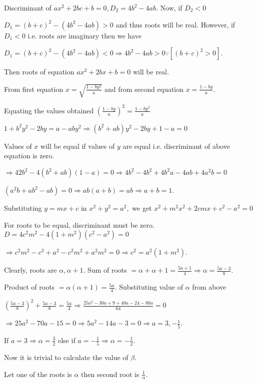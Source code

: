   Discriminant of $ax^2 + 2bc + b = 0, D_2 = 4b^2 - 4ab$. Now, if $D_2 < 0$

  $D_1 = (b + c)^2 - (4b^2 - 4ab) > 0$ and thus roots will be real. However, if $D_1 < 0$ i.e. roots are imaginary then we have

  $D_1 = (b + c)^2 - (4b^2 - 4ab) < 0 \Rightarrow 4b^2 - 4ab > 0 \because [(b + c)^2 > 0]$.

  Then roots of equation $ax^2 + 2bx + b = 0$ will be real.
\item From first equation $x = \sqrt{\frac{1 - by^2}{a}}$ and from second equation $x = \frac{1 - by}{a}$.

  Equating the values obtained $\left(\frac{1 - by}{a}\right)^2 = \frac{1 - by^2}{a}$

  $1 + b^2y^2 - 2by = a - aby^2 \Rightarrow (b^2 + ab)y^2 - 2by + 1 - a = 0$

  Values of $x$ will be equal if values of $y$ are equal i.e. discriminant of above equation is zero.

  $\Rightarrow 42b^2 - 4(b^2 + ab)(1 - a) = 0 \Rightarrow  4b^2 - 4b^2 + 4b^2a - 4ab + 4a^2b = 0$

  $(a^2b + ab^2 - ab) = 0\Rightarrow ab(a + b) = ab\Rightarrow a + b = 1$.
\item Substituting $y = mx + c$ in $x^2 + y^2 = a^2,$ we get $x^2 + m^2x^2 + 2cmx + c^2 - a^2 = 0$

  For roots to be equal, discriminant must be zero. $D = 4c^2m^2 - 4(1 + m^2)(c^2 - a^2) = 0$

  $\Rightarrow c^2m^2 - c^2 + a^2 - c^2m^2 + a^2m^2 = 0\Rightarrow c^2 = a^2(1 + m^2)$.
\item Clearly, roots are $\alpha, \alpha + 1$. Sum of roots $= \alpha + \alpha + 1 = \frac{5a +
  1}{4}\Rightarrow \alpha = \frac{5a - 3}{8}$.

  Product of roots $= \alpha(\alpha + 1) = \frac{5a}{4}$. Substituting value of $\alpha$ from above

  $\left(\frac{5a - 3}{8}\right)^2 + \frac{5a - 3}{8} = \frac{5a}{4}\Rightarrow \frac{25a^2 - 30a + 9 + 40a
    - 24 - 80a}{64} = 0$

  $\Rightarrow 25a^2 - 70a - 15 = 0 \Rightarrow 5a^2 - 14a - 3 = 0\Rightarrow a = 3, -\frac{1}{5}$.

  If $a = 3 \Rightarrow \alpha = \frac{3}{2}$ else if $a = -\frac{1}{5} \Rightarrow \alpha = -\frac{1}{2}$.

  Now it is trivial to calculate the value of $\beta$.
\item Let one of the roots is $\alpha$ then second root is $\frac{1}{\alpha}$.


